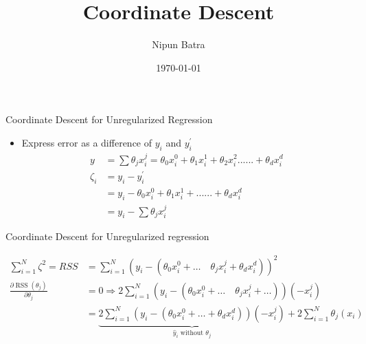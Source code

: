 \documentclass{beamer}
\title{Coordinate Descent}
\date{\today}
\author{Nipun Batra}
\institute{IIT Gandhinagar}
\begin{document}
  \maketitle
  
  
  





\begin{frame}{Coordinate Descent for Unregularized Regression}

\begin{itemize}
    

    
    
    
    \item Express error as a difference of $y_{i}$ and $y_{i}^{'}$
    \begin{align}
    y &= \sum \theta_{j}x^{j}_{i} = \theta_{0}x_{i}^{0} + \theta_{1}x_{i}^{1} +\theta_{2}x_{i}^{2} ...... + \theta_{d}x_{i}^{d}  \\
    \zeta_{i} &= y_{i} - y_{i}^{'}\\
    &= y_{i} - \theta_{0}x_{i}^{0} + \theta_{1}x_{i}^{1} + ...... + \theta_{d}x_{i}^{d}\\
    &= y_{i} - \sum \theta_{j}x_{i}^{j}
    \end{align}
   
   
    
\end{itemize}
    

\end{frame}



\begin{frame}{Coordinate Descent for Unregularized regression}

\begin{align*}
    \sum_{i=1}^{N}  \zeta^{2}=RSS &=\sum_{i=1}^{N}\left(y_{i}-\left(\theta_{0}x_{i}^{0}+\ldots \quad \theta_{j} x_{i}^{j}+\theta_{d} x_{i}^{d}\right)\right)^{2}\\
    \frac{\partial \operatorname{RSS}\left(\theta_{j}\right)}{\partial \theta_{j}}&=0 \Rightarrow 2 \sum_{i=1}^{N}\left(y_{i}-\left(\theta_{0}x_{i}^{0}+\ldots \quad \theta_{j} x_{i}^{j}+\ldots \right)\right)\left(-x_{i}^{j}\right)\\
    &=\underbrace{2\sum_{i=1}^{N}\left(y_{i}-\left(\theta_{0} x_{i}^{0}+\ldots + \theta_{d} x_{i}^{d}\right)\right)\left(-x_{i}^{j}\right)}_{\text{$\hat{y}_{i}$ without $\theta_{j}$}}+2 \sum_{i=1}^{N} \theta_{j}\left(x_{i}\right)\\
\end{align*}
\end{frame}
\end{document}
